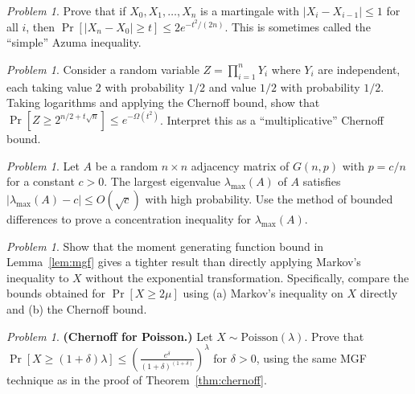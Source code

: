 \documentclass[twoside,12pt]{book}
\theoremstyle{plain}
\theoremstyle{definition}
\theoremstyle{remark}
\newtheorem{problem}[theorem]{Problem}
\begin{document}
\begin{problem}
Prove that if $X_0, X_1, \ldots, X_n$ is a martingale with $|X_i -
X_{i-1}| \leq 1$ for all $i$, then $\Pr[|X_n - X_0| \geq t] \leq
2e^{-t^2/(2n)}$. This is sometimes called the ``simple'' Azuma
inequality.
\end{problem}

\begin{problem}
Consider a random variable $Z = \prod_{i=1}^{n} Y_i$ where $Y_i$ are
independent, each taking value $2$ with probability $1/2$ and value $1/2$
with probability $1/2$. Taking logarithms and applying the Chernoff bound,
show that $\Pr[Z \geq 2^{n/2 + t\sqrt{n}}] \leq e^{-\Omega(t^2)}$.
Interpret this as a ``multiplicative'' Chernoff bound.
\end{problem}

\begin{problem}
Let $A$ be a random $n \times n$ adjacency matrix of $G(n, p)$ with $p =
c/n$ for a constant $c > 0$. The largest eigenvalue $\lambda_{\max}(A)$ of
$A$ satisfies $|\lambda_{\max}(A) - c| \leq O(\sqrt{c})$ with high
probability. Use the method of bounded differences to prove a concentration
inequality for $\lambda_{\max}(A)$.
\end{problem}

\begin{problem}
Show that the moment generating function bound in Lemma~\ref{lem:mgf}
gives a tighter result than directly applying Markov's inequality to $X$
without the exponential transformation. Specifically, compare the bounds
obtained for $\Pr[X \geq 2\mu]$ using (a) Markov's inequality on $X$
directly and (b) the Chernoff bound.
\end{problem}

\begin{problem}
\textbf{(Chernoff for Poisson.)} Let $X \sim \text{Poisson}(\lambda)$.
Prove that $\Pr[X \geq (1+\delta)\lambda] \leq
\left(\frac{e^{\delta}}{(1+\delta)^{(1+\delta)}}\right)^{\lambda}$ for
$\delta > 0$, using the same MGF technique as in the proof of
Theorem~\ref{thm:chernoff}.
\end{problem}
\end{document}
